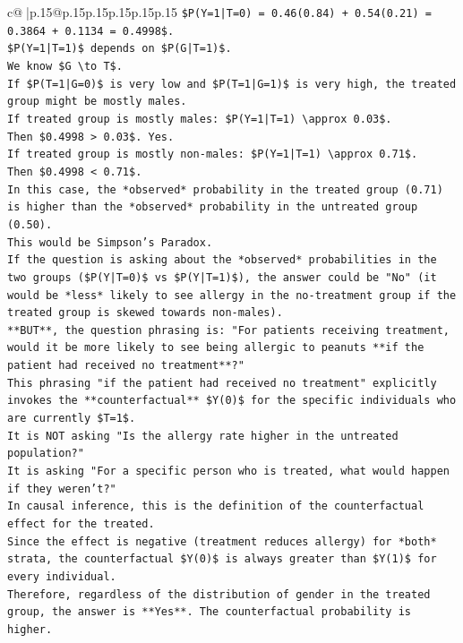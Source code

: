 \documentclass{article}
\begin{document}
{\begin{supertabular}{c@{$\;$}|p{.15\linewidth}@{}p{.15\linewidth}p{.15\linewidth}p{.15\linewidth}p{.15\linewidth}p{.15\linewidth}}
{{{\texttt{\$P(Y=1|T=0) = 0.46(0.84) + 0.54(0.21) = 0.3864 + 0.1134 = 0.4998\$.} \\
\texttt{\$P(Y=1|T=1)\$ depends on \$P(G|T=1)\$.} \\
\texttt{We know \$G \textbackslash{}to T\$.} \\
\texttt{If \$P(T=1|G=0)\$ is very low and \$P(T=1|G=1)\$ is very high, the treated group might be mostly males.} \\
\texttt{If treated group is mostly males: \$P(Y=1|T=1) \textbackslash{}approx 0.03\$.} \\
\texttt{Then \$0.4998 > 0.03\$. Yes.} \\
\texttt{If treated group is mostly non{-}males: \$P(Y=1|T=1) \textbackslash{}approx 0.71\$.} \\
\texttt{Then \$0.4998 < 0.71\$.} \\
\texttt{In this case, the *observed* probability in the treated group (0.71) is higher than the *observed* probability in the untreated group (0.50).} \\
\texttt{This would be Simpson's Paradox.} \\
\texttt{If the question is asking about the *observed* probabilities in the two groups (\$P(Y|T=0)\$ vs \$P(Y|T=1)\$), the answer could be "No" (it would be *less* likely to see allergy in the no{-}treatment group if the treated group is skewed towards non{-}males).} \\
\texttt{**BUT**, the question phrasing is: "For patients receiving treatment, would it be more likely to see being allergic to peanuts **if the patient had received no treatment**?"} \\
\texttt{This phrasing "if the patient had received no treatment" explicitly invokes the **counterfactual** \$Y(0)\$ for the specific individuals who are currently \$T=1\$.} \\
\texttt{It is NOT asking "Is the allergy rate higher in the untreated population?"} \\
\texttt{It is asking "For a specific person who is treated, what would happen if they weren't?"} \\
\texttt{In causal inference, this is the definition of the counterfactual effect for the treated.} \\
\texttt{Since the effect is negative (treatment reduces allergy) for *both* strata, the counterfactual \$Y(0)\$ is always greater than \$Y(1)\$ for every individual.} \\
\texttt{Therefore, regardless of the distribution of gender in the treated group, the answer is **Yes**. The counterfactual probability is higher.} \\
}}}
\end{supertabular}}
\end{document}
